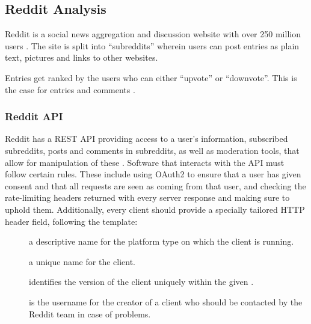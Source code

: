 \subsection{Reddit Analysis}\label{sec:reddit-analysis}
Reddit is a social news aggregation and discussion website with over 250 million
users \citep{AdvertiseOnReddit}. The site is split into ``subreddits'' wherein
users can post entries as plain text, pictures and links to other websites. \nl

Entries get ranked by the users who can either ``upvote'' or ``downvote''. This
is the case for entries and comments \citep{AboutReddit}.\nl


\subsubsection{Reddit API}\label{subsec:reddit-api}
Reddit has a \ac{REST} \ac{API} providing access to a user's information,
subscribed subreddits, posts and comments in subreddits, as well as moderation
tools, that allow for manipulation of these \citep{RedditApi}. Software that interacts with the
\ac{API} must follow certain rules. These include using OAuth2 to ensure that a
user has given consent and that all requests are seen as coming from that
user, and checking the rate-limiting headers returned with every server response
and making sure to uphold them.
Additionally, every client should provide a specially tailored 
\ac{HTTP} header field, following the template: \citep{RedditApiRules}\nl

\begin{center}
\end{center}\nl
\begin{description}
  \item[] a descriptive name for the platform type on which the
  client is running.
  \item[] a unique name for the client.
  \item[] identifies the version of the client uniquely
  within the given .
  \item[] is the username for the creator of a client who
  should be contacted by the Reddit team in case of problems.
\end{description}\nl


